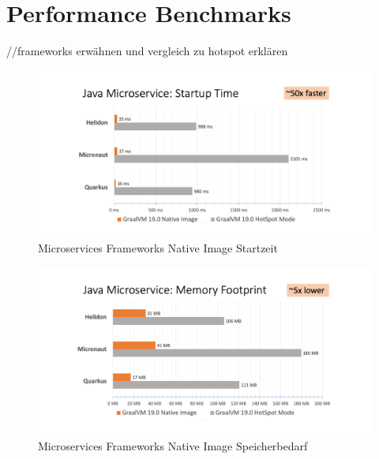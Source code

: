 \section{Performance Benchmarks}
\label{sec:performancebenchmarks}
//frameworks erwähnen und vergleich zu hotspot erklären
\begin{figure}[h]
	\centering
	\includegraphics[width=1\textwidth]{resources/ms_startup_time.png}
	\caption{Microservices Frameworks Native Image Startzeit \cite{GraalVMBenchmarks}}
	\label{fig:system_startuptime}
\end{figure}

\begin{figure}[h]
	\centering
	\includegraphics[width=1\textwidth]{resources/ms_memory_footprint.png}
	\caption{Microservices Frameworks Native Image Speicherbedarf \cite{GraalVMBenchmarks}}
	\label{fig:system_memory_footprint}
\end{figure}